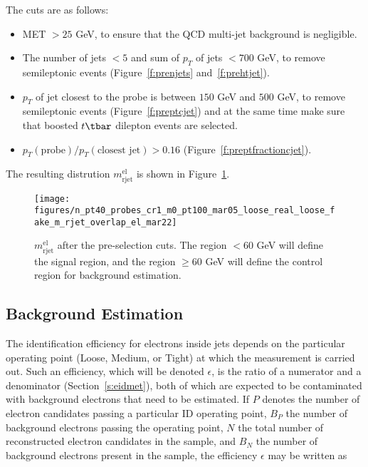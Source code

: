 The cuts are as follows:

\begin{itemize}
	\item MET $> 25$ GeV, to ensure that the QCD multi-jet background is negligible.

	\item The number of jets $< 5$ and sum of $p_T$ of jets $< 700$ GeV, to remove
	      semileptonic events (Figure~\ref{f:prenjets} and~\ref{f:prehtjet}).


	\item $p_T$ of jet closest to the probe is between $150$ GeV and $500$ GeV, to
	      remove semileptonic events (Figure~\ref{f:preptcjet}) and at the
	      same time make sure that boosted $t\tbar$ dilepton events are selected.


	\item $p_T(\text{probe})  / p_T(\text{closest jet}) > 0.16 $ (Figure~\ref{f:preptfractioncjet}).

\end{itemize}

The resulting distrution $m_{\text{rjet}}^{\text{el}}$ is shown in Figure~\ref{f:crmrjet}.

\begin{figure}[H]
	\texttt{[image: figures/n\_pt40\_probes\_cr1\_m0\_pt100\_mar05\_loose\_real\_loose\_fake\_m\_rjet\_overlap\_el\_mar22]}
	\centering

	\caption{$m_{\text{rjet}}^{\text{el}}$ after the pre-selection cuts. The
		region $< 60$ GeV will define the signal region, and the region $\geq 60$ GeV
		will define the control region for background estimation.}

	\label{f:crmrjet}
\end{figure}

\subsection{Background Estimation}\label{s:eidbe}

The identification efficiency for electrons inside jets depends on the
particular operating point (Loose, Medium, or Tight) at which the measurement
is carried out. Such an efficiency, which will be denoted $\epsilon$, is the
ratio of a numerator and a denominator (Section~\ref{s:eidmet}), both of which
are expected to be contaminated with background electrons that need to be
estimated. If $P$ denotes the number of electron candidates passing a
particular ID operating point, $B_P$ the number of background electrons passing
the operating point, $N$ the total number of reconstructed electron candidates
in the sample, and $B_N$ the number of background electrons present in the
sample, the efficiency $\epsilon$ may be written as

